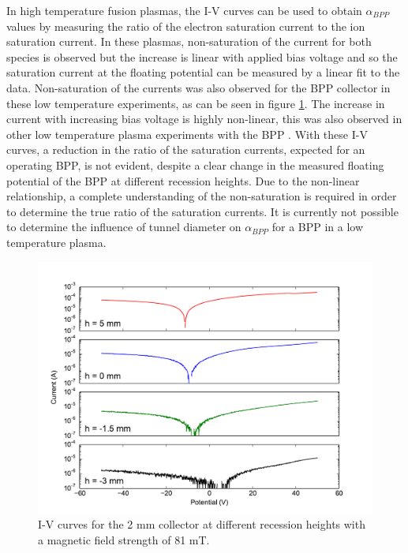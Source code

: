 In high temperature fusion plasmas, the I-V curves can be used to obtain $\alpha_{BPP}$ values by measuring the ratio of the electron saturation current to the ion saturation current. In these plasmas, non-saturation of the current for both species is observed but the increase is linear with applied bias voltage and so the saturation current at the floating potential can be measured by a linear fit to the data. Non-saturation of the currents was also observed for the BPP collector in these low temperature experiments, as can be seen in figure \ref{fig:IV}. The increase in current with increasing bias voltage is highly non-linear, this was also observed in other low temperature plasma experiments with the BPP \cite{low_t}. With these I-V curves, a reduction in the ratio of the saturation currents, expected for an operating BPP, is not evident, despite a clear change in the measured floating potential of the BPP at different recession heights. Due to the non-linear relationship, a complete understanding of the non-saturation is required in order to determine the true ratio of the saturation currents. It is currently not possible to determine the influence of tunnel diameter on $\alpha_{BPP}$ for a BPP in a low temperature plasma.

\begin{figure}[H]
\centering

\includegraphics[width=1\textwidth]{IV.pdf}

\caption{I-V curves for the 2 mm collector at different recession heights with a magnetic field strength of 81 mT.}

\label{fig:IV}
\end{figure}

